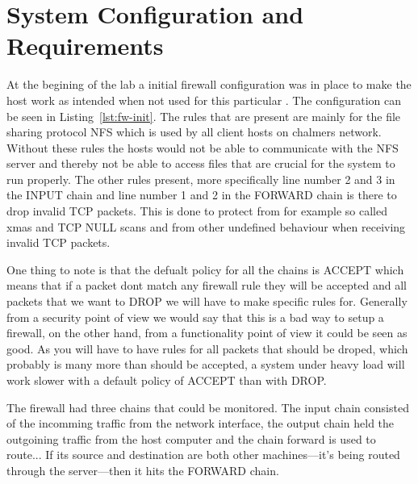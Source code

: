 \section{System Configuration and Requirements}
\label{sec:setup}

At the begining of the lab a initial firewall configuration was in place to make the host work as intended when not used for this particular \lab. The configuration can be seen in Listing~\ref{lst:fw-init}. The rules that are present are mainly for the file sharing protocol NFS which is used by all client hosts on chalmers network. Without these rules the hosts would not be able to communicate with the NFS server and thereby not be able to access files that are crucial for the system to run properly. The other rules present, more specifically line number 2 and 3 in the INPUT chain and line number 1 and 2 in the FORWARD chain is there to drop invalid TCP packets. This is done to protect from for example so called xmas and TCP NULL scans and from other undefined behaviour when receiving invalid TCP packets.

One thing to note is that the defualt policy for all the chains is ACCEPT which means that if a packet dont match any firewall rule they will be accepted and all packets that we want to DROP we will have to make specific rules for. Generally from a security point of view we would say that this is a bad way to setup a firewall, on the other hand, from a functionality point of view it could be seen as good. As you will have to have rules for all packets that should be droped, which probably is many more than should be accepted, a system under heavy load will work slower with a default policy of ACCEPT than with DROP.  



The firewall had three chains that could be monitored. The input chain consisted of the incomming traffic from the network interface, the output chain held the outgoining traffic from the host computer and the chain forward is used to route... If its source and destination are both other machines—it's being routed through the server—then it hits the FORWARD chain.



